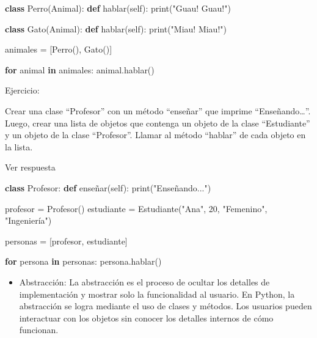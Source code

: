 \documentclass[
  a4paper,
  DIV=11,
  numbers=noendperiod,
  onepage,
  openany]{scrreprt}
\newenvironment{Shaded}{\begin{snugshade}}{\end{snugshade}}
\newcommand{\BuiltInTok}[1]{\textcolor[rgb]{0.00,0.23,0.31}{#1}}
\newcommand{\ControlFlowTok}[1]{\textcolor[rgb]{0.00,0.23,0.31}{\textbf{#1}}}
\newcommand{\DecValTok}[1]{\textcolor[rgb]{0.68,0.00,0.00}{#1}}
\newcommand{\KeywordTok}[1]{\textcolor[rgb]{0.00,0.23,0.31}{\textbf{#1}}}
\newcommand{\NormalTok}[1]{\textcolor[rgb]{0.00,0.23,0.31}{#1}}
\newcommand{\OperatorTok}[1]{\textcolor[rgb]{0.37,0.37,0.37}{#1}}
\newcommand{\StringTok}[1]{\textcolor[rgb]{0.13,0.47,0.30}{#1}}
\newcommand{\VariableTok}[1]{\textcolor[rgb]{0.07,0.07,0.07}{#1}}
\providecommand{\tightlist}{%
  \setlength{\itemsep}{0pt}\setlength{\parskip}{0pt}}\usepackage{longtable,booktabs,array}
\begin{document}
\begin{tcolorbox}
\begin{Shaded}
\begin{Highlighting}[]
\KeywordTok{class}\NormalTok{ Perro(Animal):}
    \KeywordTok{def}\NormalTok{ hablar(}\VariableTok{self}\NormalTok{):}
        \BuiltInTok{print}\NormalTok{(}\StringTok{"Guau! Guau!"}\NormalTok{)}

\KeywordTok{class}\NormalTok{ Gato(Animal):}
    \KeywordTok{def}\NormalTok{ hablar(}\VariableTok{self}\NormalTok{):}
        \BuiltInTok{print}\NormalTok{(}\StringTok{"Miau! Miau!"}\NormalTok{)}

\NormalTok{animales }\OperatorTok{=}\NormalTok{ [Perro(), Gato()]}

\ControlFlowTok{for}\NormalTok{ animal }\KeywordTok{in}\NormalTok{ animales:}
\NormalTok{    animal.hablar()}
\end{Highlighting}
\end{Shaded}

Ejercicio:

Crear una clase ``Profesor'' con un método ``enseñar'' que imprime
``Enseñando\ldots{}''. Luego, crear una lista de objetos que contenga un
objeto de la clase ``Estudiante'' y un objeto de la clase ``Profesor''.
Llamar al método ``hablar'' de cada objeto en la lista.

Ver respuesta

\begin{Shaded}
\begin{Highlighting}[]
\KeywordTok{class}\NormalTok{ Profesor:}
    \KeywordTok{def}\NormalTok{ enseñar(}\VariableTok{self}\NormalTok{):}
        \BuiltInTok{print}\NormalTok{(}\StringTok{"Enseñando..."}\NormalTok{)}

\NormalTok{profesor }\OperatorTok{=}\NormalTok{ Profesor()}
\NormalTok{estudiante }\OperatorTok{=}\NormalTok{ Estudiante(}\StringTok{"Ana"}\NormalTok{, }\DecValTok{20}\NormalTok{, }\StringTok{"Femenino"}\NormalTok{, }\StringTok{"Ingeniería"}\NormalTok{)}

\NormalTok{personas }\OperatorTok{=}\NormalTok{ [profesor, estudiante]}

\ControlFlowTok{for}\NormalTok{ persona }\KeywordTok{in}\NormalTok{ personas:}
\NormalTok{    persona.hablar()}
\end{Highlighting}
\end{Shaded}

\begin{itemize}
\tightlist
\item
  Abstracción: La abstracción es el proceso de ocultar los detalles de
  implementación y mostrar solo la funcionalidad al usuario. En Python,
  la abstracción se logra mediante el uso de clases y métodos. Los
  usuarios pueden interactuar con los objetos sin conocer los detalles
  internos de cómo funcionan.
\end{itemize}


\end{tcolorbox}
\end{document}
